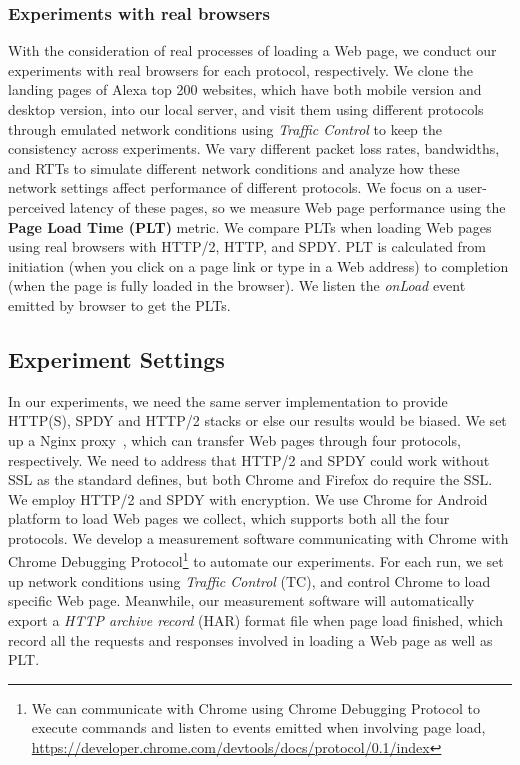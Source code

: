 \subsubsection{Experiments with real browsers}
 
With the consideration of real processes of loading a Web page, we conduct our experiments with real browsers for each protocol, respectively. We clone the landing pages of Alexa top 200 websites, which have both mobile version and desktop version, into our local server, and visit them using different protocols through emulated network conditions using \textit{Traffic Control} to keep the consistency across experiments. We vary different packet loss rates, bandwidths, and RTTs to simulate different network conditions and analyze how these network settings affect performance of different protocols. We focus on a user-perceived latency of these pages, so we measure Web page performance using the \textbf{Page Load Time (PLT)} metric. We compare PLTs when loading Web pages using real browsers with HTTP/2, HTTP, and SPDY. PLT is calculated from initiation (when you click on a page link or type in a Web address) to completion (when the page is fully loaded in the browser). We listen the \textit{onLoad} event emitted by browser to get the PLTs.

\subsection{Experiment Settings}

In our experiments, we need the same server implementation to provide HTTP(S), SPDY and HTTP/2 stacks or else our results would be biased. We set up a Nginx proxy~\cite{nginx}, which can transfer Web pages through four protocols, respectively. We need to address that HTTP/2 and SPDY could work without SSL as the standard defines, but both Chrome and Firefox do require the SSL. We employ HTTP/2 and SPDY with encryption. We use Chrome for Android platform to load Web pages we collect, which supports both all the four protocols. We develop a measurement software communicating with Chrome with Chrome Debugging Protocol\footnote{We can communicate with Chrome using Chrome Debugging Protocol to execute commands and listen to events emitted when involving page load, \url{https://developer.chrome.com/devtools/docs/protocol/0.1/index}} to automate our experiments. For each run, we set up network conditions using \textit{Traffic Control} (TC), and control Chrome to load specific Web page. Meanwhile, our measurement software will automatically export a \textit{HTTP archive record} (HAR) format file when page load finished, which record all the requests and responses involved in loading a Web page as well as PLT. 
 
